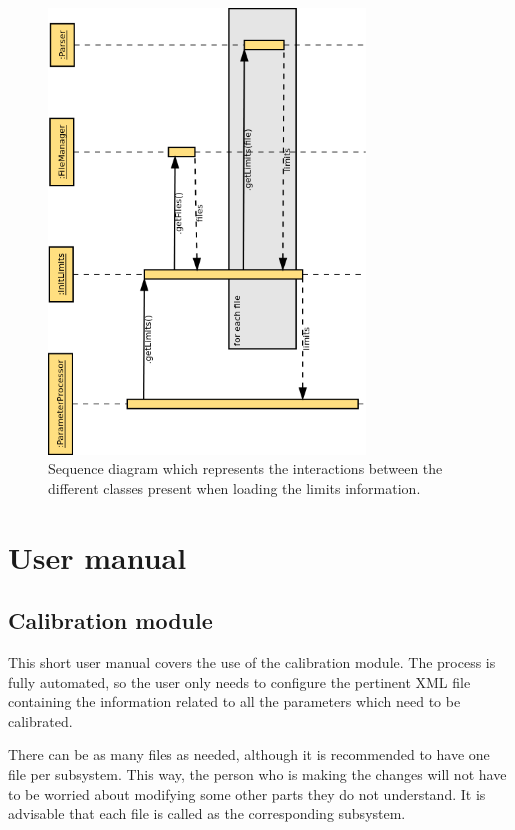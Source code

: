 \begin{figure}[H]
\centerline{\includegraphics[width=0.75\textwidth]{images/InitLimitsSequence.png}}
\caption{Sequence diagram which represents the interactions between the different classes present when loading the limits information.}
\label{f5.8}
\end{figure}


\pagebreak
\section{User manual}
\subsection{Calibration module}
This short user manual covers the use of the calibration module. The process is fully automated, so the user only needs to configure the pertinent XML file containing the information related to all the parameters which need to be calibrated.

There can be as many files as needed, although it is recommended to have one file per subsystem. This way, the person who is making the changes will not have to be worried about modifying some other parts they do not understand. It is advisable that each file is called as the corresponding subsystem.


